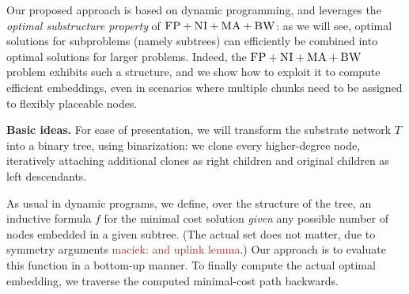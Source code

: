 \documentclass[9pt]{sigcomm-alternate}
\newcommand{\maciek}[1]{\textcolor{brown}{maciek: #1}}
\newcommand{\CC}{\textsc{NI}}
\newcommand{\FP}{\textsc{FP}}
\newcommand{\BW}{\textsc{BW}}
\newcommand{\MA}{\textsc{MA}}
\newcommand{\Tree}{\ensuremath{T}}
\begin{document}

Our proposed approach is based on dynamic programming, and
leverages the \emph{optimal substructure property} of $\FP+\CC+\MA+\BW$:
as we will see, optimal solutions for subproblems (namely subtrees)
can efficiently be combined into optimal solutions for larger problems.
Indeed, the $\FP+\CC+\MA+\BW$ problem
exhibits such a structure, and we show how to exploit it to
compute efficient embeddings, even in scenarios where multiple chunks
need to be assigned to flexibly placeable nodes.

\textbf{Basic ideas.} For ease of presentation, we will transform the substrate network $\Tree$
into a binary tree, using binarization:
we clone every higher-degree node,
iteratively attaching additional clones as right children
and original children as left descendants.

As usual in dynamic programs, we define, over the structure of the tree, an inductive formula $f$ for
the minimal cost solution \emph{given} any possible number of nodes
embedded in a given subtree. (The actual set does not matter,
due to symmetry arguments \maciek{and uplink lemma}.)
Our approach is to evaluate this function in a bottom-up
manner.
To finally compute the actual optimal embedding,
we traverse the computed minimal-cost path backwards.
\end{document}
